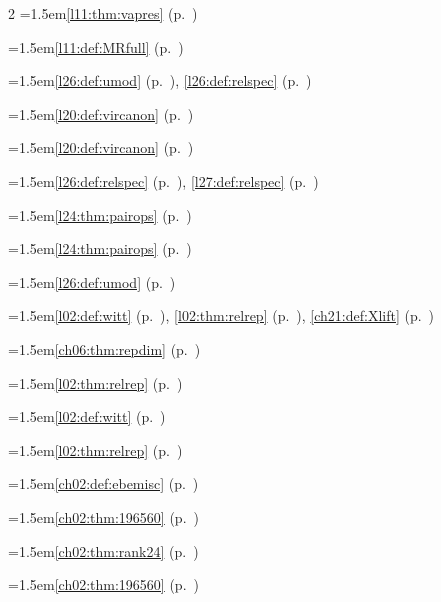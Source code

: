 \begin{multicols}{2}
\hangindent=1.5em\quad \ref{l11:thm:vapres} (p.~\pageref{l11:thm:vapres})\par
\hangindent=1.5em\quad \ref{l11:def:MRfull} (p.~\pageref{l11:def:MRfull})\par
\hangindent=1.5em\quad \ref{l26:def:umod} (p.~\pageref{l26:def:umod}), \ref{l26:def:relspec} (p.~\pageref{l26:def:relspec})\par
\hangindent=1.5em\quad \ref{l20:def:vircanon} (p.~\pageref{l20:def:vircanon})\par
\hangindent=1.5em\quad \ref{l20:def:vircanon} (p.~\pageref{l20:def:vircanon})\par
\hangindent=1.5em\quad \ref{l26:def:relspec} (p.~\pageref{l26:def:relspec}), \ref{l27:def:relspec} (p.~\pageref{l27:def:relspec})\par
\hangindent=1.5em\quad \ref{l24:thm:pairops} (p.~\pageref{l24:thm:pairops})\par
\hangindent=1.5em\quad \ref{l24:thm:pairops} (p.~\pageref{l24:thm:pairops})\par
\hangindent=1.5em\quad \ref{l26:def:umod} (p.~\pageref{l26:def:umod})\par
\hangindent=1.5em\quad \ref{l02:def:witt} (p.~\pageref{l02:def:witt}), \ref{l02:thm:relrep} (p.~\pageref{l02:thm:relrep}), \ref{ch21:def:Xlift} (p.~\pageref{ch21:def:Xlift})\par
\hangindent=1.5em\quad \ref{ch06:thm:repdim} (p.~\pageref{ch06:thm:repdim})\par
\hangindent=1.5em\quad \ref{l02:thm:relrep} (p.~\pageref{l02:thm:relrep})\par
\hangindent=1.5em\quad \ref{l02:def:witt} (p.~\pageref{l02:def:witt})\par
\hangindent=1.5em\quad \ref{l02:thm:relrep} (p.~\pageref{l02:thm:relrep})\par
\hangindent=1.5em\quad \ref{ch02:def:ebemisc} (p.~\pageref{ch02:def:ebemisc})\par
\hangindent=1.5em\quad \ref{ch02:thm:196560} (p.~\pageref{ch02:thm:196560})\par
\hangindent=1.5em\quad \ref{ch02:thm:rank24} (p.~\pageref{ch02:thm:rank24})\par
\hangindent=1.5em\quad \ref{ch02:thm:196560} (p.~\pageref{ch02:thm:196560})\par

\end{multicols}
